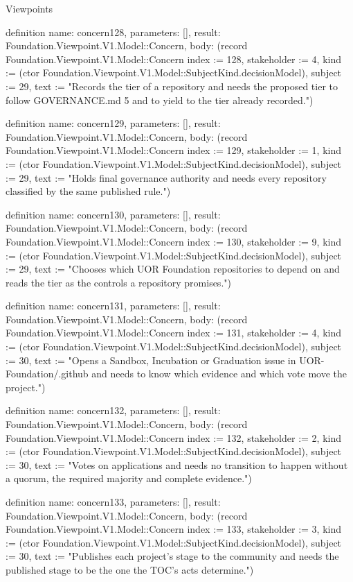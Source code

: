 \begin{lexlean}{Viewpoints}
\begin{semanticmodule}
definition{
  name: concern128,
  parameters: [],
  result: Foundation.Viewpoint.V1.Model::Concern,
  body: (record Foundation.Viewpoint.V1.Model::Concern {index := 128, stakeholder := 4, kind := (ctor Foundation.Viewpoint.V1.Model::SubjectKind.decisionModel), subject := 29, text := "Records the tier of a repository and needs the proposed tier to follow GOVERNANCE.md 5 and to yield to the tier already recorded."})
}

definition{
  name: concern129,
  parameters: [],
  result: Foundation.Viewpoint.V1.Model::Concern,
  body: (record Foundation.Viewpoint.V1.Model::Concern {index := 129, stakeholder := 1, kind := (ctor Foundation.Viewpoint.V1.Model::SubjectKind.decisionModel), subject := 29, text := "Holds final governance authority and needs every repository classified by the same published rule."})
}

definition{
  name: concern130,
  parameters: [],
  result: Foundation.Viewpoint.V1.Model::Concern,
  body: (record Foundation.Viewpoint.V1.Model::Concern {index := 130, stakeholder := 9, kind := (ctor Foundation.Viewpoint.V1.Model::SubjectKind.decisionModel), subject := 29, text := "Chooses which UOR Foundation repositories to depend on and reads the tier as the controls a repository promises."})
}

definition{
  name: concern131,
  parameters: [],
  result: Foundation.Viewpoint.V1.Model::Concern,
  body: (record Foundation.Viewpoint.V1.Model::Concern {index := 131, stakeholder := 4, kind := (ctor Foundation.Viewpoint.V1.Model::SubjectKind.decisionModel), subject := 30, text := "Opens a Sandbox, Incubation or Graduation issue in UOR-Foundation/.github and needs to know which evidence and which vote move the project."})
}

definition{
  name: concern132,
  parameters: [],
  result: Foundation.Viewpoint.V1.Model::Concern,
  body: (record Foundation.Viewpoint.V1.Model::Concern {index := 132, stakeholder := 2, kind := (ctor Foundation.Viewpoint.V1.Model::SubjectKind.decisionModel), subject := 30, text := "Votes on applications and needs no transition to happen without a quorum, the required majority and complete evidence."})
}

definition{
  name: concern133,
  parameters: [],
  result: Foundation.Viewpoint.V1.Model::Concern,
  body: (record Foundation.Viewpoint.V1.Model::Concern {index := 133, stakeholder := 3, kind := (ctor Foundation.Viewpoint.V1.Model::SubjectKind.decisionModel), subject := 30, text := "Publishes each project's stage to the community and needs the published stage to be the one the TOC's acts determine."})
}


\end{semanticmodule}
\end{lexlean}
